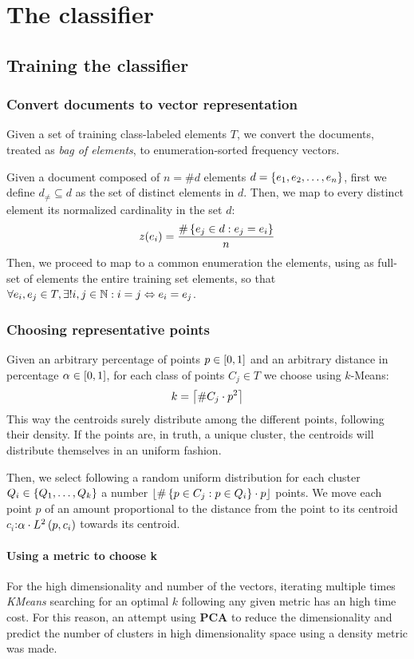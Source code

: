 \documentclass[\main/main.tex]{subfiles}
\begin{document}
\chapter{The classifier}

\section{Training the classifier}

\subsection{Convert documents to vector representation}
Given a set of training class-labeled elements \(T\), we convert the documents, treated as \textit{bag of elements}, to enumeration-sorted frequency vectors.

Given a document composed of \(n=\#d\) elements \(d = \left\{e_1, e_2, \ldots, e_n\right\}\), first we define \(d_\neq \subseteq d\) as the set of distinct elements in \(d\). Then, we map to every distinct element its normalized cardinality in the set \(d\):
\[
	z(e_i) = \frac{\#\left\{e_j \in d: e_j=e_i\right\}}{n}
\]
Then, we proceed to map to a common enumeration the elements, using as full-set of elements the entire training set elements, so that \(\forall e_i, e_j \in T, \exists! i, j \in \mathbb{N}: i=j \Leftrightarrow e_i=e_j \).

\subsection{Choosing representative points}
Given an arbitrary percentage of points \(p \in \left[0,1\right]\) and an arbitrary distance in percentage \(\alpha \in \left[0,1\right]\), for each class of points \(C_j \in T\) we choose using \(k\)-Means:
\[
	k=\left\lceil\#C_j\cdot p^2\right\rceil
\]
This way the centroids surely distribute among the different points, following their density. If the points are, in truth, a unique cluster, the centroids will distribute themselves in an uniform fashion.

Then, we select following a random uniform distribution for each cluster \(Q_i \in \left\{Q_1, \ldots, Q_k\right\}\) a number \(\left\lfloor\#\left\{p \in C_j: p \in Q_i\right\}\cdot p\right\rfloor\) points. We move each point \(p\) of an amount proportional to the distance from the point to its centroid \(c_i\):\(\alpha \cdot L^2\left(p, c_i\right)\) towards its centroid.

\subsubsection{Using a metric to choose k}
For the high dimensionality and number of the vectors, iterating multiple times \textit{KMeans} searching for an optimal \(k\) following any given metric has an high time cost. For this reason, an attempt using \textbf{PCA} to reduce the dimensionality and predict the number of clusters in high dimensionality space using a density metric was made.
\end{document}
